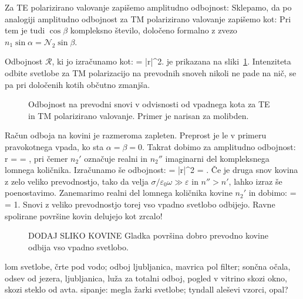 Za TE polarizirano valovanje zapišemo amplitudno odbojnost:
Sklepamo, da po analogiji amplitudno odbojnost za TM polarizirano valovanje zapišemo kot: 
Pri tem je tudi $\cos \beta$ kompleksno število, določeno formalno 
z zvezo $n_1 \sin \alpha = \mathcal{N}_2 \sin \beta$.

Odbojnost $\mathcal{R}$, ki jo izračunamo kot:
\beq
{} = |r|^2.
\label{eq:04_100a}
\eeq
je prikazana na sliki~\ref{fig:04_kovina}. Intenziteta odbite svetlobe za TM polarizacijo 
na prevodnih snoveh nikoli ne pade na nič, se pa pri določenih kotih občutno
zmanjša. 
\begin{figure}[ht]
\centering
\def\svgwidth{60truemm} 

\caption{Odbojnost na prevodni snovi v odvisnosti od vpadnega kota za TE in TM polarizirano
valovanje. Primer je narisan za molibden.}
\label{fig:04_kovina}
\end{figure}

Račun odboja na kovini je razmeroma zapleten. Preprost je le v primeru pravokotnega vpada, 
ko sta $\alpha = \beta = 0$. Takrat dobimo za amplitudno odbojnost:
\beq
r =  = ,
\label{eq:04_101}
\eeq
pri čemer $n_2'$ označuje realni in $n_2''$ imaginarni del kompleksnega lomnega količnika.
Izračunamo še odbojnost:
\beq
{} = |r|^2 = .
\label{eq:04_102}
\eeq
Če je druga snov kovina z zelo veliko prevodnostjo, tako da velja $\sigma/\varepsilon_0 \omega \gg \varepsilon$
in $n''> n'$, lahko izraz še poenostavimo. Zanemarimo realni del lomnega količnika kovine $n_2'$
in dobimo:
\beq
{} =  = 1.
\label{eq:04_103}
\eeq
Snovi z veliko prevodnostjo torej vso vpadno svetlobo odbijejo. Ravne spolirane površine kovin
delujejo kot zrcalo!
\begin{figure}[ht]
\centering
\caption{DODAJ SLIKO KOVINE Gladka površina dobro prevodno kovine odbija vso vpadno svetlobo.}
\label{fig:04_KovinaFoto}
\end{figure}

lom svetlobe, črte pod vodo; odboj ljubljanica, mavrica pol filter; sončna očala, 
odsev od jezera, ljubljanica, luža za totalni odboj, pogled v vitrino skozi okno, skozi steklo
od avta. 
sipanje: megla žarki svetlobe; tyndall aleševi vzorci, opal?
